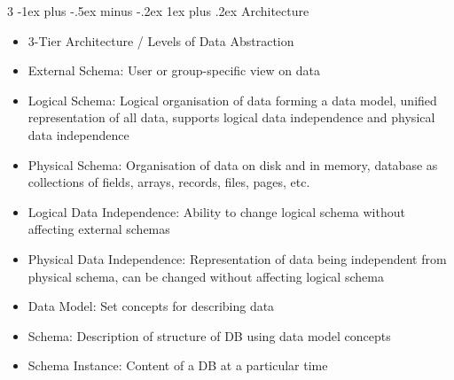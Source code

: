 \documentclass[10pt, landscape]{article}
\makeatletter
\renewcommand{\subsection}{\@startsection{subsection}{3}{0mm}%
                                {-1ex plus -.5ex minus -.2ex}%
                                {1ex plus .2ex}%
                                {\normalfont\small\bfseries}}%
\makeatother
\begin{document}
\begin{multicols*}{3}
\subsection{Architecture}
\begin{itemize}
    \item 3-Tier Architecture / Levels of Data Abstraction
    \item External Schema: User or group-specific view on data
    \item Logical Schema: Logical organisation of data forming a data model, unified representation of all data, supports logical data independence and physical data independence
    \item Physical Schema: Organisation of data on disk and in memory, database as collections of fields, arrays, records, files, pages, etc.
    \item Logical Data Independence: Ability to change logical schema without affecting external schemas
    \item Physical Data Independence: Representation of data being independent from physical schema, can be changed without affecting logical schema
    \item Data Model: Set concepts for describing data
    \item Schema: Description of structure of DB using data model concepts
    \item Schema Instance: Content of a DB at a particular time
\end{itemize}


\end{multicols*}
\end{document}
